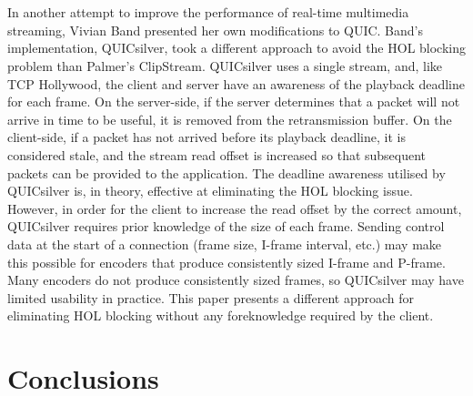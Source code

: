 \documentclass{mpaper}
\begin{document}
\\\\
In another attempt to improve the performance of real-time multimedia streaming, Vivian Band presented her own modifications to QUIC\cite{QUICSilver}. Band's implementation, QUICsilver, took a different approach to avoid the HOL blocking problem than Palmer's ClipStream. QUICsilver uses a single stream, and, like TCP Hollywood, the client and server have an awareness of the playback deadline for each frame. On the server-side, if the server determines that a packet will not arrive in time to be useful, it is removed from the retransmission buffer. On the client-side, if a packet has not arrived before its playback deadline, it is considered stale, and the stream read offset is increased so that subsequent packets can be provided to the application. The deadline awareness utilised by QUICsilver is, in theory, effective at eliminating the HOL blocking issue. However, in order for the client to increase the read offset by the correct amount, QUICsilver requires prior knowledge of the size of each frame. Sending control data at the start of a connection (frame size, I-frame interval, etc.) may make this possible for encoders that produce consistently sized I-frame and P-frame. Many encoders do not produce consistently sized frames, so QUICsilver may have limited usability in practice. This paper presents a different approach for eliminating HOL blocking without any foreknowledge required by the client.


\section{Conclusions} \label{Conclusions}
\end{document}
